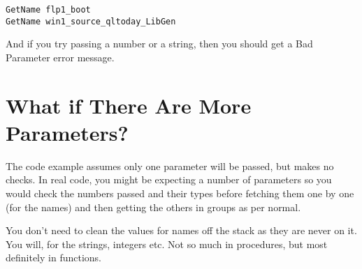\begin{lstlisting}[frame=none,numbers=none]
GetName flp1_boot
GetName win1_source_qltoday_LibGen
\end{lstlisting}

And if you try passing a number or a string, then you should get a Bad Parameter error message.

\section{What if There Are More Parameters?}

The code example assumes only one parameter will be passed, but makes no checks. In real code, you might be expecting a number of parameters so you would check the numbers passed and their types before fetching them one by one (for the names) and then getting the others in groups as per normal. 

You don't need to clean the values for names off the stack as they are never on it. You will, for the strings, integers etc. Not so much in procedures, but most definitely in functions.

